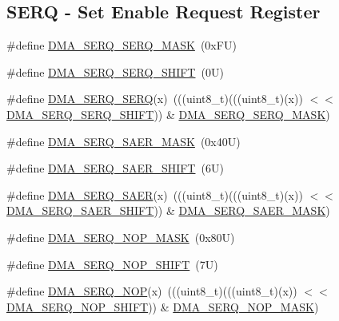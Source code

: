 \subsection*{S\+E\+RQ -\/ Set Enable Request Register}
\begin{DoxyCompactItemize}
\item 
\#define \mbox{\hyperlink{group___d_m_a___register___masks_ga42b17276b88c86b34cabdbf64e4686c2}{D\+M\+A\+\_\+\+S\+E\+R\+Q\+\_\+\+S\+E\+R\+Q\+\_\+\+M\+A\+SK}}~(0x\+F\+U)
\item 
\#define \mbox{\hyperlink{group___d_m_a___register___masks_ga41f7ac5f6e15267810208ea0146bdcad}{D\+M\+A\+\_\+\+S\+E\+R\+Q\+\_\+\+S\+E\+R\+Q\+\_\+\+S\+H\+I\+FT}}~(0\+U)
\item 
\#define \mbox{\hyperlink{group___d_m_a___register___masks_ga0b5a7acb359bcc57dd725102edfd21f9}{D\+M\+A\+\_\+\+S\+E\+R\+Q\+\_\+\+S\+E\+RQ}}(x)~(((uint8\+\_\+t)(((uint8\+\_\+t)(x)) $<$$<$ \mbox{\hyperlink{group___d_m_a___register___masks_ga41f7ac5f6e15267810208ea0146bdcad}{D\+M\+A\+\_\+\+S\+E\+R\+Q\+\_\+\+S\+E\+R\+Q\+\_\+\+S\+H\+I\+FT}})) \& \mbox{\hyperlink{group___d_m_a___register___masks_ga42b17276b88c86b34cabdbf64e4686c2}{D\+M\+A\+\_\+\+S\+E\+R\+Q\+\_\+\+S\+E\+R\+Q\+\_\+\+M\+A\+SK}})
\item 
\#define \mbox{\hyperlink{group___d_m_a___register___masks_gad102371be9a2c3a971988f98297f85eb}{D\+M\+A\+\_\+\+S\+E\+R\+Q\+\_\+\+S\+A\+E\+R\+\_\+\+M\+A\+SK}}~(0x40\+U)
\item 
\#define \mbox{\hyperlink{group___d_m_a___register___masks_ga47c6cd05ecac5d87cdd944a6a3630571}{D\+M\+A\+\_\+\+S\+E\+R\+Q\+\_\+\+S\+A\+E\+R\+\_\+\+S\+H\+I\+FT}}~(6\+U)
\item 
\#define \mbox{\hyperlink{group___d_m_a___register___masks_ga0a739afb83bbff124fdc17bfc9764372}{D\+M\+A\+\_\+\+S\+E\+R\+Q\+\_\+\+S\+A\+ER}}(x)~(((uint8\+\_\+t)(((uint8\+\_\+t)(x)) $<$$<$ \mbox{\hyperlink{group___d_m_a___register___masks_ga47c6cd05ecac5d87cdd944a6a3630571}{D\+M\+A\+\_\+\+S\+E\+R\+Q\+\_\+\+S\+A\+E\+R\+\_\+\+S\+H\+I\+FT}})) \& \mbox{\hyperlink{group___d_m_a___register___masks_gad102371be9a2c3a971988f98297f85eb}{D\+M\+A\+\_\+\+S\+E\+R\+Q\+\_\+\+S\+A\+E\+R\+\_\+\+M\+A\+SK}})
\item 
\#define \mbox{\hyperlink{group___d_m_a___register___masks_ga149895dd87ae0297478305fb26cc426e}{D\+M\+A\+\_\+\+S\+E\+R\+Q\+\_\+\+N\+O\+P\+\_\+\+M\+A\+SK}}~(0x80\+U)
\item 
\#define \mbox{\hyperlink{group___d_m_a___register___masks_ga2aef1400cca514fe504a0f23b53bea33}{D\+M\+A\+\_\+\+S\+E\+R\+Q\+\_\+\+N\+O\+P\+\_\+\+S\+H\+I\+FT}}~(7\+U)
\item 
\#define \mbox{\hyperlink{group___d_m_a___register___masks_ga5c20d8c3b9be8c549305fa13c96bd79b}{D\+M\+A\+\_\+\+S\+E\+R\+Q\+\_\+\+N\+OP}}(x)~(((uint8\+\_\+t)(((uint8\+\_\+t)(x)) $<$$<$ \mbox{\hyperlink{group___d_m_a___register___masks_ga2aef1400cca514fe504a0f23b53bea33}{D\+M\+A\+\_\+\+S\+E\+R\+Q\+\_\+\+N\+O\+P\+\_\+\+S\+H\+I\+FT}})) \& \mbox{\hyperlink{group___d_m_a___register___masks_ga149895dd87ae0297478305fb26cc426e}{D\+M\+A\+\_\+\+S\+E\+R\+Q\+\_\+\+N\+O\+P\+\_\+\+M\+A\+SK}})
\end{DoxyCompactItemize}
